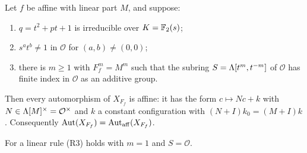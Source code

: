 \begin{lemma}\label{aff:lem:R}
Let $f$ be affine with linear part $M$, and suppose:
\begin{enumerate}
\item[(R1)] $q=t^2+pt+1$ is irreducible over $K=\mathbb{F}_2(s)$;
\item[(R2)] $s^at^b\ne1$ in $\mathcal O$ for $(a,b)\ne(0,0)$;
\item[(R3)] there is $m\ge1$ with $F_f^m=M^m$ such that the subring $S=\Lambda[t^m,t^{-m}]$ of $\mathcal O$ has finite index in $\mathcal O$ as an additive group.
\end{enumerate}
Then every automorphism of $X_{F_f}$ is affine: it has the form $c\mapsto Nc+k$ with $N\in\Lambda[M]^{\times}=\mathcal O^{\times}$ and $k$ a constant configuration with $(N+I)k_0=(M+I)k$. Consequently $\operatorname{Aut}(X_{F_f})=\operatorname{Aut}_{\mathrm{aff}}(X_{F_f})$.
\end{lemma}

For a linear rule (R3) holds with $m=1$ and $S=\mathcal O$.

